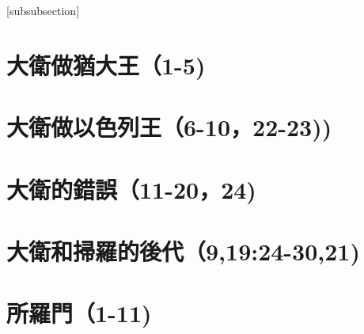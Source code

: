 \documentclass{ctexart}
\begin{document}
[subsubsection]
\def\subsubsubsectionmark#1{}
\def\thesubsubsubsection {\thesubsubsection 
      .\arabic{subsubsubsection}}
\def\subsubsubsection{\@startsection
      {subsubsubsection}{4}{\z@} {-3.25ex plus -1
      ex minus -.2ex}{1.5ex plus .2ex}{\normalsize\bf}}
\def\l@subsubsubsection{\@dottedtocline{4}{4.8em}
      {4.2em}}
      
\renewcommand{\paragraph}{\@startsection{paragraph}{4}{0ex}%
    {-3.25ex plus -1ex minus -0.2ex}%
    {1.5ex plus 0.2ex}%
    {\normalfont\normalsize\bfseries}}
\makeatother      
\tableofcontents
\thispagestyle{empty}
\listoffigures
\thispagestyle{empty}
\listoftables
\thispagestyle{empty}


\let\origdescription\description
\renewenvironment{description}{
  \setlength{\leftmargini}{5em}
  \origdescription
  \setlength{\itemindent}{5em}
  \setlength{\labelsep}{\textwidth}
}
{\endlist}


\pagestyle{fancy}  

\maketitle 

\section{大衛做猶大王（1-5)}
\section{大衛做以色列王（6-10，22-23))}
\section{大衛的錯誤（11-20，24)}
\section{大衛和掃羅的後代（9,19:24-30,21)}



\section{所羅門（1-11)}
\end{document}
